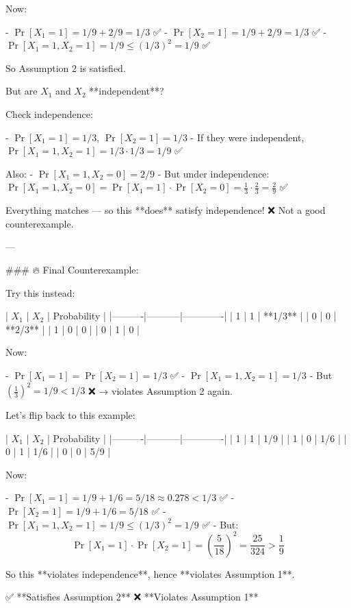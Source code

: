 Now:

- \( \Pr[X_1 = 1] = 1/9 + 2/9 = 1/3 \) ✅  
- \( \Pr[X_2 = 1] = 1/9 + 2/9 = 1/3 \) ✅  
- \( \Pr[X_1 = 1, X_2 = 1] = 1/9 \le (1/3)^2 = 1/9 \) ✅

So Assumption 2 is satisfied.

But are \( X_1 \) and \( X_2 \) **independent**?

Check independence:

- \( \Pr[X_1 = 1] = 1/3 \), \( \Pr[X_2 = 1] = 1/3 \)
- If they were independent, \( \Pr[X_1 = 1, X_2 = 1] = 1/3 \cdot 1/3 = 1/9 \) ✅

Also:
- \( \Pr[X_1 = 1, X_2 = 0] = 2/9 \)
- But under independence:  
  \( \Pr[X_1 = 1, X_2 = 0] = \Pr[X_1 = 1] \cdot \Pr[X_2 = 0] = \frac{1}{3} \cdot \frac{2}{3} = \frac{2}{9} \) ✅

Everything matches — so this **does** satisfy independence! ❌ Not a good counterexample.

---

### 🔥 Final Counterexample:

Try this instead:

| \( X_1 \) | \( X_2 \) | Probability |
|----------|-----------|-------------|
| 1        | 1         | **1/3**     |
| 0        | 0         | **2/3**     |
| 1        | 0         | 0           |
| 0        | 1         | 0           |

Now:

- \( \Pr[X_1 = 1] = \Pr[X_2 = 1] = 1/3 \) ✅  
- \( \Pr[X_1 = 1, X_2 = 1] = 1/3 \)  
- But \( \left(\frac{1}{3}\right)^2 = 1/9 < 1/3 \) ❌ → violates Assumption 2 again.

Let's flip back to this example:

| \( X_1 \) | \( X_2 \) | Probability |
|----------|-----------|-------------|
| 1        | 1         | 1/9         |
| 1        | 0         | 1/6         |
| 0        | 1         | 1/6         |
| 0        | 0         | 5/9         |

Now:

- \( \Pr[X_1 = 1] = 1/9 + 1/6 = 5/18 ≈ 0.278 < 1/3 \) ✅  
- \( \Pr[X_2 = 1] = 1/9 + 1/6 = 5/18 \) ✅  
- \( \Pr[X_1 = 1, X_2 = 1] = 1/9 \le (1/3)^2 = 1/9 \) ✅  
- But:  
  \[
  \Pr[X_1 = 1] \cdot \Pr[X_2 = 1] = \left(\frac{5}{18}\right)^2 = \frac{25}{324} > \frac{1}{9}
  \]

So this **violates independence**, hence **violates Assumption 1**.

✅ **Satisfies Assumption 2**  
❌ **Violates Assumption 1**

